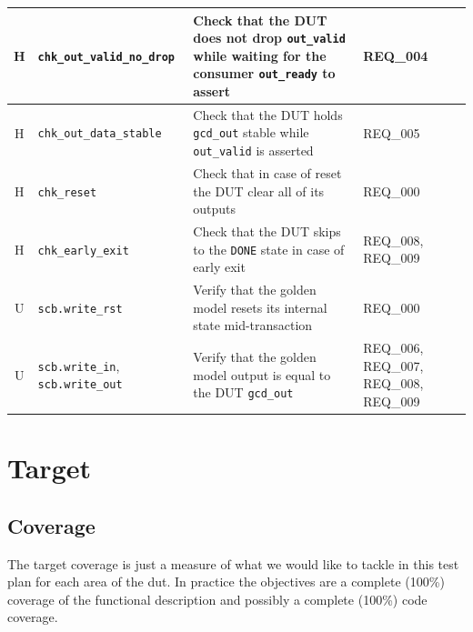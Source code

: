 \begin{table}[H]
\begin{tabularx}{\textwidth}{|c|p{3.9cm}|X|p{1.7cm}|}
        H               & \texttt{chk\_out\_valid\_no\_drop}                                                & Check that the DUT does not drop \texttt{out\_valid} while waiting for the consumer \texttt{out\_ready} to assert         & REQ\_004                                          \\ \midrule
        H               & \texttt{chk\_out\_data\_stable}                                                   & Check that the DUT holds \texttt{gcd\_out} stable while \texttt{out\_valid} is asserted                                   & REQ\_005                                          \\ \midrule
        H               & \texttt{chk\_reset}                                                               & Check that in case of reset the DUT clear all of its outputs                                                              & REQ\_000                                          \\ \midrule
        H               & \texttt{chk\_early\_exit}                                                         & Check that the DUT skips to the \texttt{DONE} state in case of early exit                                                 & REQ\_008, REQ\_009                                \\ \bottomrule \toprule
        U               & \texttt{scb.write\_rst}                                                           & Verify that the golden model resets its internal state mid-transaction                                                    & REQ\_000                                          \\ \midrule
        U               & \texttt{scb.write\_in}, \texttt{scb.write\_out}                                   & Verify that the golden model output is equal to the DUT \texttt{gcd\_out}                                                 & REQ\_006, REQ\_007, REQ\_008, REQ\_009            \\ \bottomrule
    \end{tabularx}
\end{table}

\section{Target}

\subsection*{Coverage}
The target coverage is just a measure of what we would like to tackle in this test plan for each area of the dut.
In practice the objectives are a complete (100\%) coverage of the functional description and possibly a complete (100\%) code coverage.

